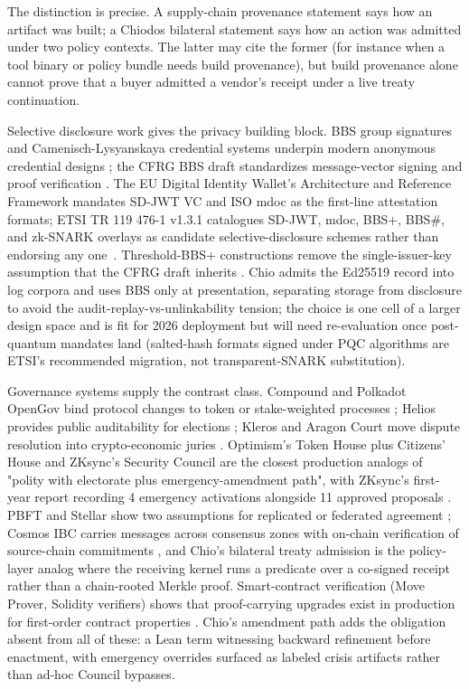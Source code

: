 The distinction is precise. A supply-chain provenance statement says how an artifact was built; a Chiodos bilateral statement says how an action was admitted under two policy contexts. The latter may cite the former (for instance when a tool binary or policy bundle needs build provenance), but build provenance alone cannot prove that a buyer admitted a vendor's receipt under a live treaty continuation.

Selective disclosure work gives the privacy building block. BBS group signatures and Camenisch-Lysyanskaya credential systems underpin modern anonymous credential designs \cite{boneh2004bbs,camenisch2001credentials}; the CFRG BBS draft standardizes message-vector signing and proof verification \cite{bbsDraft}. The EU Digital Identity Wallet's Architecture and Reference Framework mandates SD-JWT VC and ISO mdoc as the first-line attestation formats; ETSI TR 119 476-1 v1.3.1 catalogues SD-JWT, mdoc, BBS+, BBS\#, and zk-SNARK overlays as candidate selective-disclosure schemes rather than endorsing any one~\cite{etsiSelectiveDisclosure2025}. Threshold-BBS+ constructions remove the single-issuer-key assumption that the CFRG draft inherits \cite{doernerThresholdBBS2023,nofGoyalNonInteractiveThresholdBBS2025}. Chio admits the Ed25519 record into log corpora and uses BBS only at presentation, separating storage from disclosure to avoid the audit-replay-vs-unlinkability tension; the choice is one cell of a larger design space and is fit for 2026 deployment but will need re-evaluation once post-quantum mandates land (salted-hash formats signed under PQC algorithms are ETSI's recommended migration, not transparent-SNARK substitution).

Governance systems supply the contrast class. Compound and Polkadot OpenGov bind protocol changes to token or stake-weighted processes \cite{compoundGov,polkadotOpenGov}; Helios provides public auditability for elections \cite{adida2008helios}; Kleros and Aragon Court move dispute resolution into crypto-economic juries \cite{kleros2019,aragonCourt}. Optimism's Token House plus Citizens' House and ZKsync's Security Council are the closest production analogs of "polity with electorate plus emergency-amendment path", with ZKsync's first-year report recording 4 emergency activations alongside 11 approved proposals \cite{optimismGov,zksyncSecurityCouncil2025}. PBFT and Stellar show two assumptions for replicated or federated agreement \cite{castro1999pbft,mazieres2015stellar}; Cosmos IBC carries messages across consensus zones with on-chain verification of source-chain commitments \cite{ibcCosmos}, and Chio's bilateral treaty admission is the policy-layer analog where the receiving kernel runs a predicate over a co-signed receipt rather than a chain-rooted Merkle proof. Smart-contract verification (Move Prover, Solidity verifiers) shows that proof-carrying upgrades exist in production for first-order contract properties \cite{schneiderFMBC2025}. Chio's amendment path adds the obligation absent from all of these: a Lean term witnessing backward refinement before enactment, with emergency overrides surfaced as labeled crisis artifacts rather than ad-hoc Council bypasses.

